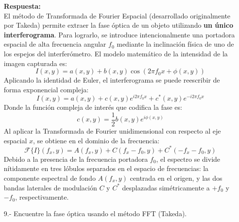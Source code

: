 \documentclass[12pt,letterpaper]{article}
\begin{document}
\begin{enumerate}
		\vspace{0.3cm}
		\textbf{Respuesta:} \\
		El método de Transformada de Fourier Espacial (desarrollado originalmente por Takeda) permite extraer la fase óptica de un objeto utilizando \textbf{un único interferograma}. Para lograrlo, se introduce intencionalmente una portadora espacial de alta frecuencia angular $f_0$ mediante la inclinación física de uno de los espejos del interferómetro. El modelo matemático de la intensidad de la imagen capturada es:
		\[ I(x,y) = a(x,y) + b(x,y) \cos(2\pi f_0 x + \phi(x,y)) \]
		Aplicando la identidad de Euler, el interferograma se puede reescribir de forma exponencial compleja:
		\[ I(x,y) = a(x,y) + c(x,y)e^{i 2\pi f_0 x} + c^*(x,y)e^{-i 2\pi f_0 x} \]
		Donde la función compleja de interés que codifica la fase es:
		\[ c(x,y) = \frac{1}{2}b(x,y)e^{i\phi(x,y)} \]
		Al aplicar la Transformada de Fourier unidimensional con respecto al eje espacial $x$, se obtiene en el dominio de la frecuencia:
		\[ \mathcal{F}\{I\}(f_x, y) = A(f_x, y) + C(f_x - f_0, y) + C^*(-f_x - f_0, y) \]
		Debido a la presencia de la frecuencia portadora $f_0$, el espectro se divide nítidamente en tres lóbulos separados en el espacio de frecuencias: la componente espectral de fondo $A(f_x, y)$ centrada en el origen, y las dos bandas laterales de modulación $C$ y $C^*$ desplazadas simétricamente a $+f_0$ y $-f_0$, respectivamente.
		\vspace{0.5cm}
		
		\item[9.-] Encuentre la fase óptica usando el método FFT (Takeda).
		

\end{enumerate}
\end{document}
